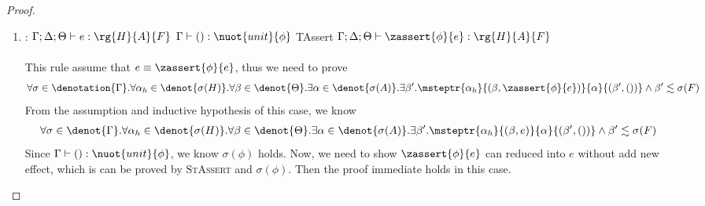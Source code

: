 \begin{proof}
\begin{enumerate}[label=Case]
\item:
{\footnotesize
\mprooftr{45mm}
{$\Gamma;\Delta;\Theta \vdash e : \rg{H}{A}{F}$ \quad
$\Gamma \vdash () : \nuot{unit}{\phi}$}
{TAssert}
{$\Gamma;\Delta;\Theta \vdash \zassert{\phi}{e} : \rg{H}{A}{F}  $}
\ \\ \ \\}
This rule assume that $e \equiv \zassert{\phi}{e}$, thus we need to prove
{\footnotesize\begin{align*}
\forall \sigma \in
    \denotation{\Gamma}. \forall \alpha_h \in \denot{\sigma(H)}.\forall \beta \in \denot{\Theta}. \exists \alpha \in \denot{\sigma(A)}.\exists \beta'. \msteptr{\alpha_h}{(\beta, \zassert{\phi}{e})}{\alpha}{(\beta', ())} \land \beta' \realz \sigma(F)
\end{align*}}\noindent
From the assumption and inductive hypothesis of this case, we know
{\footnotesize\begin{align*}
    & \forall \sigma \in \denot{\Gamma}.\forall \alpha_h \in \denot{\sigma(H)}.\forall \beta \in \denot{\Theta}. \exists \alpha \in \denot{\sigma(A)}.\exists \beta'. \msteptr{\alpha_h}{(\beta, e)}{\alpha}{(\beta', ())} \land \beta' \realz \sigma(F)
\end{align*}}\noindent
Since $\Gamma \vdash () : \nuot{unit}{\phi}$, we know $\sigma(\phi)$ holds.
Now, we need to show $\zassert{\phi}{e}$ can reduced into $e$ without add new effect, which is can be proved by \textsc{StAssert} and $\sigma(\phi)$. Then the proof immediate holds in this case.


\end{enumerate}
\end{proof}
